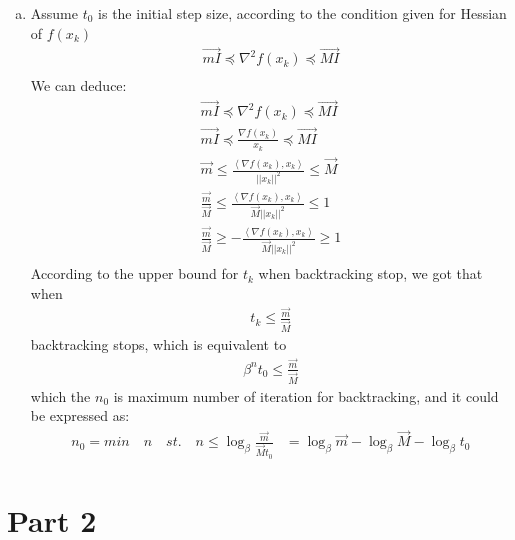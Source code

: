 \documentclass[12pt,twoside]{article}
\begin{document}
\begin{enumerate}[a)]
\item
Assume $t_0$ is the initial step size, according to the condition given for Hessian of $f(x_k)$
\begin{align}
\vec{mI} \preceq   \nabla^2 f(x_k) \preceq \vec{MI}\\
\end{align}
We can deduce:
\begin{align}
\vec{mI} \preceq   \nabla^2 f(x_k) \preceq \vec{MI}\\
\vec{mI} \preceq  \frac{\nabla f(x_k) }{x_k} \preceq \vec{MI}\\
\vec{m} \leq  \frac{\left\langle\nabla f(x_k),  x_k\right\rangle }{||x_k||^2} \leq \vec{M}\\
\frac{\vec{m} }{\vec{M}} \leq  \frac{\left\langle\nabla f(x_k),  x_k\right\rangle }{\vec{M}||x_k||^2} \leq 1\\
\frac{\vec{m} }{\vec{M}} \geq  - \frac{\left\langle\nabla f(x_k),  x_k\right\rangle }{\vec{M}||x_k||^2} \geq 1\\
\end{align}
According to the upper bound for $t_k$ when backtracking stop, we got that when
\begin{align}
t_k \leq \frac{\vec{m} }{\vec{M}}
\end{align}
backtracking stops, which is equivalent to
\begin{align}
\beta^n t_0 \leq \frac{\vec{m} }{\vec{M}}
\end{align}
which the $n_0$ is maximum number of iteration for backtracking, and it could be expressed as:
\begin{align}
n_0 = min \quad n \quad st. \quad n \leq \log_\beta \frac{\vec{m}}{\vec{M}t_0} &= \log_\beta \vec{m} - \log_\beta \vec{M} - \log_\beta t_0
\end{align}
\end{enumerate}

\section{Part 2}
\end{document}

